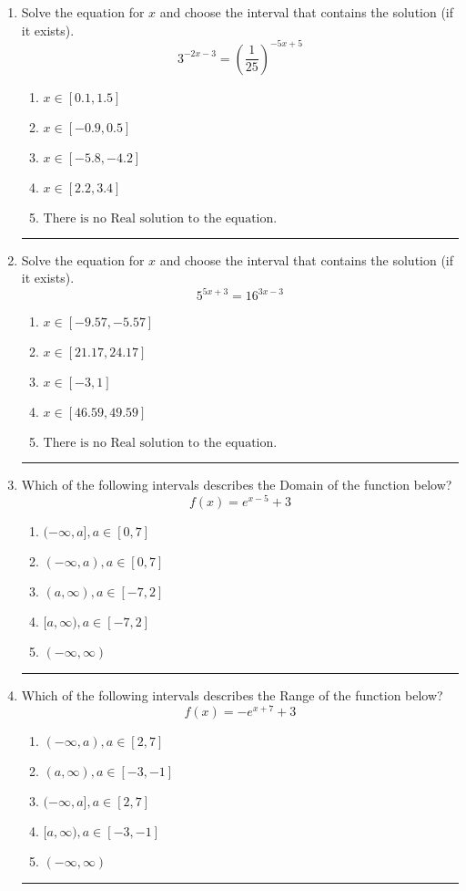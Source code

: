 \documentclass[14pt]{extbook}
\newcommand{\litem}[1]{\item#1\hspace*{-1cm}\rule{\textwidth}{0.4pt}}
\begin{document}
\begin{enumerate}
\litem{
Solve the equation for $x$ and choose the interval that contains the solution (if it exists).\[ 3^{-2x-3} = \left(\frac{1}{25}\right)^{-5x+5} \]\begin{enumerate}[label=\Alph*.]
\item \( x \in [0.1, 1.5] \)
\item \( x \in [-0.9, 0.5] \)
\item \( x \in [-5.8, -4.2] \)
\item \( x \in [2.2, 3.4] \)
\item \( \text{There is no Real solution to the equation.} \)

\end{enumerate} }
\litem{
Solve the equation for $x$ and choose the interval that contains the solution (if it exists).\[ 5^{5x+3} = 16^{3x-3} \]\begin{enumerate}[label=\Alph*.]
\item \( x \in [-9.57, -5.57] \)
\item \( x \in [21.17, 24.17] \)
\item \( x \in [-3, 1] \)
\item \( x \in [46.59, 49.59] \)
\item \( \text{There is no Real solution to the equation.} \)

\end{enumerate} }
\litem{
Which of the following intervals describes the Domain of the function below?\[ f(x) = e^{x-5}+3 \]\begin{enumerate}[label=\Alph*.]
\item \( (-\infty, a], a \in [0, 7] \)
\item \( (-\infty, a), a \in [0, 7] \)
\item \( (a, \infty), a \in [-7, 2] \)
\item \( [a, \infty), a \in [-7, 2] \)
\item \( (-\infty, \infty) \)

\end{enumerate} }
\litem{
Which of the following intervals describes the Range of the function below?\[ f(x) = -e^{x+7}+3 \]\begin{enumerate}[label=\Alph*.]
\item \( (-\infty, a), a \in [2, 7] \)
\item \( (a, \infty), a \in [-3, -1] \)
\item \( (-\infty, a], a \in [2, 7] \)
\item \( [a, \infty), a \in [-3, -1] \)
\item \( (-\infty, \infty) \)


\end{enumerate}}
\end{enumerate}
\end{document}
